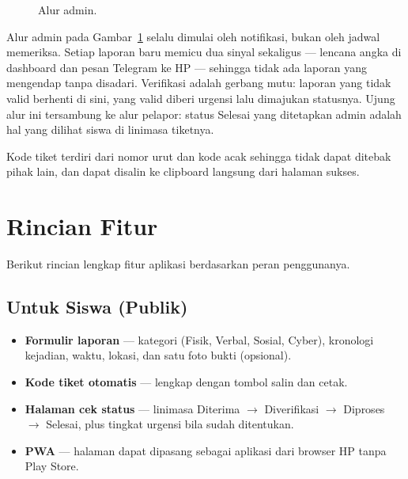 \documentclass[12pt,a4paper]{article}
\begin{document}
\begin{figure}[h]
\centering
{}
\caption{Alur admin.}
\label{fig:alura}
\end{figure}

Alur admin pada Gambar~\ref{fig:alura} selalu dimulai oleh notifikasi, bukan
oleh jadwal memeriksa. Setiap laporan baru memicu dua sinyal sekaligus ---
lencana angka di dashboard dan pesan Telegram ke HP --- sehingga tidak ada
laporan yang mengendap tanpa disadari. Verifikasi adalah gerbang mutu:
laporan yang tidak valid berhenti di sini, yang valid diberi urgensi lalu
dimajukan statusnya. Ujung alur ini tersambung ke alur pelapor: status Selesai
yang ditetapkan admin adalah hal yang dilihat siswa di linimasa tiketnya.

Kode tiket terdiri dari nomor urut dan kode acak sehingga tidak dapat ditebak
pihak lain, dan dapat disalin ke clipboard langsung dari halaman sukses.

\section{Rincian Fitur}
Berikut rincian lengkap fitur aplikasi berdasarkan peran penggunanya.
\subsection{Untuk Siswa (Publik)}
\begin{itemize}
  \item \textbf{Formulir laporan} --- kategori (Fisik, Verbal, Sosial, Cyber),
        kronologi kejadian, waktu, lokasi, dan satu foto bukti (opsional).
  \item \textbf{Kode tiket otomatis} --- lengkap dengan tombol salin dan cetak.
  \item \textbf{Halaman cek status} --- linimasa Diterima $\rightarrow$
        Diverifikasi $\rightarrow$ Diproses $\rightarrow$ Selesai, plus
        tingkat urgensi bila sudah ditentukan.
  \item \textbf{PWA} --- halaman dapat dipasang sebagai aplikasi dari browser HP
        tanpa Play Store.
\end{itemize}
\end{document}
